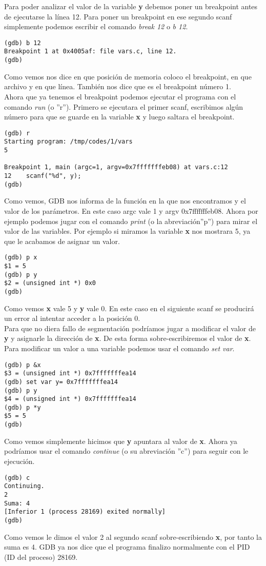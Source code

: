 Para poder analizar el valor de la variable \textbf{y} debemos poner un breakpoint antes de ejecutarse la línea 12. Para poner un breakpoint en ese segundo scanf simplemente podemos escribir el comando \emph{break 12} o \emph{b 12}. 
\begin{verbatim}
(gdb) b 12
Breakpoint 1 at 0x4005af: file vars.c, line 12.
(gdb) 
\end{verbatim}
Como vemos nos dice en que posición de memoria coloco el breakpoint, en que archivo y en que línea. También nos dice que es el breakpoint número 1. \\
Ahora que ya tenemos el breakpoint podemos ejecutar el programa con el comando \emph{run} (o ''r''). Primero se ejecutara el primer scanf, escribimos algún número para que se guarde en la variable \textbf{x} y luego saltara el breakpoint.
\begin{verbatim}
(gdb) r
Starting program: /tmp/codes/1/vars 
5 

Breakpoint 1, main (argc=1, argv=0x7fffffffeb08) at vars.c:12
12	  scanf("%d", y);
(gdb) 
\end{verbatim}
Como vemos, GDB nos informa de la función en la que nos encontramos y el valor de los parámetros. En este caso argc vale 1 y argv 0x7fffffffeb08.
Ahora por ejemplo podemos jugar con el comando \emph{print} (o la abreviación''p'') para mirar el valor de las variables. Por ejemplo si miramos la variable \textbf{x} nos mostrara 5, ya que le acabamos de asignar un valor. 
\begin{verbatim}
(gdb) p x
$1 = 5
(gdb) p y
$2 = (unsigned int *) 0x0
(gdb)
\end{verbatim}
Como vemos \textbf{x} vale 5 y \textbf{y} vale 0. En este caso en el siguiente scanf se producirá un error al intentar acceder a la posición 0. \\ Para que no diera fallo de segmentación podríamos jugar a modificar el valor de \textbf{y} y asignarle la dirección de \textbf{x}. De esta forma sobre-escribiremos el valor de \textbf{x}. \\ Para modificar un valor a una variable podemos usar el comando \emph{set var}.
\begin{verbatim}
(gdb) p &x
$3 = (unsigned int *) 0x7fffffffea14
(gdb) set var y= 0x7fffffffea14
(gdb) p y
$4 = (unsigned int *) 0x7fffffffea14
(gdb) p *y
$5 = 5
(gdb)
\end{verbatim}
Como vemos simplemente hicimos que \textbf{y} apuntara al valor de \textbf{x}.
Ahora ya podríamos usar el comando \emph{continue} (o su abreviación ''c'') para seguir con le ejecución.
\begin{verbatim}
(gdb) c
Continuing.
2   
Suma: 4
[Inferior 1 (process 28169) exited normally]
(gdb) 
\end{verbatim}
Como vemos le dimos el valor 2 al segundo scanf sobre-escribiendo \textbf{x}, por tanto la suma es 4. GDB ya nos dice que el programa finalizo normalmente con el PID (ID del proceso) 28169.\\

